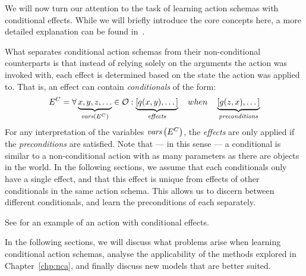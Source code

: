 \documentclass[../Master.tex]{subfiles}
\begin{document}
We will now turn our attention to the task of learning action schemas with conditional effects. While we will briefly introduce the core concepts here, a more detailed explanation can be found in~. 

What separates conditional action schemas from their non-conditional counterparts is that instead of relying solely on the arguments the action was invoked with, each effect is determined based on the state the action was applied to. That is, an effect can contain \emph{conditionals} of the form:
\begin{equation*}
    E^C = \forall \underbrace{x, y, z, \dots}_{\textit{vars} \left(E^C\right)}\in \mathcal{O} : 
    \underbrace{\left[ q(x, y), \dots \right]}_{\textit{effects}} \quad when \quad 
    \underbrace{\left[ g(z, x), \dots  \right]}_{\textit{preconditions}}
\end{equation*}
For any interpretation of the variables $\textit{vars}\left(E^C\right)$, the \textit{effects} are only applied if the \textit{preconditions} are satisfied. Note that --- in this sense --- a conditional is similar to a non-conditional action with as many parameters as there are objects in the world. In the following sections, we assume that each conditionals only have a single effect, and that this effect is unique from effects of other conditionals in the same action schema. This allows us to discern between different conditionals, and learn the preconditions of each separately.

See  for an example of an action with conditional effects. 

In the following sections, we will discuss what problems arise when learning conditional action schemas, analyse the applicability of the methods explored in Chapter~\ref{chp:nca}, and finally discuss new models that are better suited.
\end{document}
